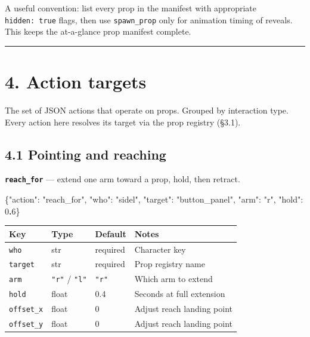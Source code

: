 \documentclass[
  11pt,
]{book}
\newenvironment{Shaded}{}{}
\newcommand{\DataTypeTok}[1]{\textcolor[rgb]{0.56,0.13,0.00}{#1}}
\newcommand{\DecValTok}[1]{\textcolor[rgb]{0.25,0.63,0.44}{#1}}
\newcommand{\ErrorTok}[1]{\textcolor[rgb]{1.00,0.00,0.00}{\textbf{#1}}}
\newcommand{\FunctionTok}[1]{\textcolor[rgb]{0.02,0.16,0.49}{#1}}
\newcommand{\StringTok}[1]{\textcolor[rgb]{0.25,0.44,0.63}{#1}}
\begin{document}
A useful convention: list every prop in the manifest with appropriate
\texttt{hidden:\ true} flags, then use \texttt{spawn\_prop} only for
animation timing of reveals. This keeps the at-a-glance prop manifest
complete.

\begin{center}\rule{0.5\linewidth}{0.5pt}\end{center}

\section{4. Action targets}\label{action-targets-1}

The set of JSON actions that operate on props. Grouped by interaction
type. Every action here resolves its target via the prop registry
(§3.1).

\subsection{4.1 Pointing and reaching}\label{pointing-and-reaching}

\textbf{\texttt{reach\_for}} --- extend one arm toward a prop, hold,
then retract.

\begin{Shaded}
\begin{Highlighting}[]
\FunctionTok{\{}\DataTypeTok{"action"}\FunctionTok{:} \StringTok{"reach\_for"}\FunctionTok{,} \DataTypeTok{"who"}\FunctionTok{:} \StringTok{"sidel"}\FunctionTok{,} \DataTypeTok{"target"}\FunctionTok{:} \StringTok{"button\_panel"}\FunctionTok{,}
 \DataTypeTok{"arm"}\FunctionTok{:} \StringTok{"r"}\FunctionTok{,} \DataTypeTok{"hold"}\FunctionTok{:} \DecValTok{0}\ErrorTok{.}\DecValTok{6}\FunctionTok{\}}
\end{Highlighting}
\end{Shaded}

\begin{longtable}[]{@{}llll@{}}
\toprule\noalign{}
Key & Type & Default & Notes \\
\midrule\noalign{}
\endhead
\bottomrule\noalign{}
\endlastfoot
\texttt{who} & str & required & Character key \\
\texttt{target} & str & required & Prop registry name \\
\texttt{arm} & \texttt{"r"} / \texttt{"l"} & \texttt{"r"} & Which arm to
extend \\
\texttt{hold} & float & 0.4 & Seconds at full extension \\
\texttt{offset\_x} & float & 0 & Adjust reach landing point \\
\texttt{offset\_y} & float & 0 & Adjust reach landing point \\
\end{longtable}
\end{document}
